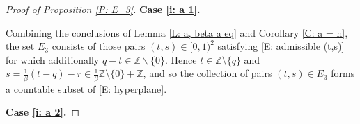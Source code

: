 \documentclass[11pt]{amsart}
\theoremstyle{definition}
\newcommand{\Z}{{\mathbb Z}}
\newcommand{\1}{{\mathbf{1}}}
\begin{document}
\begin{proof}[Proof of Proposition \ref{P: E_3}]
     \smallskip
     \textbf{Case \eqref{i: a 1}.}
     \smallskip

    Combining the conclusions of Lemma \ref{L: a, beta a eq} and Corollary \ref{C: a = n}, the set $E_3$ consists of those pairs $(t,s)\in[0,1)^2$ satisfying \eqref{E: admissible (t,s)} for which additionally $q-t\in\mathbb{Z}\backslash\{0\}$.
    Hence $t\in\Z\setminus\{q\}$ and $s  = \frac{1}{\beta}(t-q)-r\in \frac{1}{\beta}\Z\setminus\{0\} + \Z$, and so the collection of pairs $(t,s)\in E_3$ forms a countable subset of \eqref{E: hyperplane}.
    


    \smallskip
    \textbf{Case \eqref{i: a 2}.}
    \smallskip


\end{proof}
\end{document}
